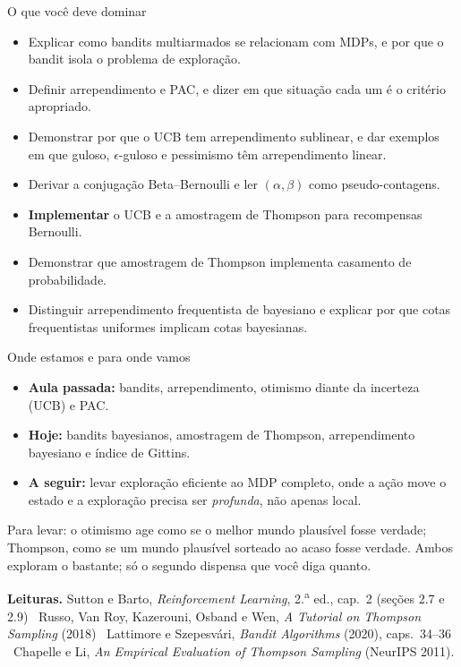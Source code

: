 \documentclass[aspectratio=169, 11pt]{beamer}
\begin{document}
\begin{frame}{O que você deve dominar}
  \begin{itemize}
    \item Explicar como bandits multiarmados se relacionam com MDPs, e por
          que o bandit isola o problema de exploração.
    \item Definir arrependimento e PAC, e dizer em que situação cada um é o
          critério apropriado.
    \item Demonstrar por que o UCB tem arrependimento sublinear, e dar
          exemplos em que guloso, $\epsilon$-guloso e pessimismo têm
          arrependimento linear.
    \item Derivar a conjugação Beta--Bernoulli e ler $(\alpha,\beta)$ como
          pseudo-contagens.
    \item \textbf{Implementar} o UCB e a amostragem de Thompson para
          recompensas Bernoulli.
    \item Demonstrar que amostragem de Thompson implementa casamento de
          probabilidade.
    \item Distinguir arrependimento frequentista de bayesiano e explicar
          por que cotas frequentistas uniformes implicam cotas bayesianas.
  \end{itemize}
\end{frame}

\begin{frame}{Onde estamos e para onde vamos}
  \begin{itemize}
    \item \textbf{Aula passada:} bandits, arrependimento, otimismo diante
          da incerteza (UCB) e PAC.
    \item \textbf{Hoje:} bandits bayesianos, amostragem de Thompson,
          arrependimento bayesiano e índice de Gittins.
    \item \textbf{A seguir:} levar exploração eficiente ao MDP completo,
          onde a ação move o estado e a exploração precisa ser
          \emph{profunda}, não apenas local.
  \end{itemize}

  \begin{ideiabox}
    Para levar: \alert{o otimismo age como se o melhor mundo plausível
    fosse verdade; Thompson, como se um mundo plausível sorteado ao acaso
    fosse verdade}. Ambos exploram o bastante; só o segundo dispensa que
    você diga quanto.
  \end{ideiabox}

  \smallskip
  {\footnotesize\color{rlCinza}\textbf{Leituras.} Sutton e Barto,
  \emph{Reinforcement Learning}, 2.\textsuperscript{a} ed., cap.~2 (seções
  2.7 e 2.9) \textbullet\ Russo, Van Roy, Kazerouni, Osband e Wen,
  \emph{A Tutorial on Thompson Sampling} (2018) \textbullet\ Lattimore e
  Szepesvári, \emph{Bandit Algorithms} (2020), caps.~34--36 \textbullet\
  Chapelle e Li, \emph{An Empirical Evaluation of Thompson Sampling}
  (NeurIPS 2011).}
\end{frame}
\end{document}
